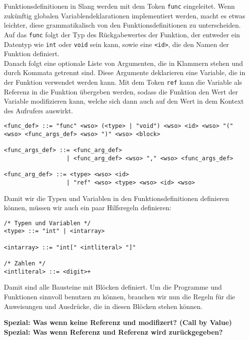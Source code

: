 Funktionsdefinitionen in Slang werden mit dem Token \texttt{func} eingeleitet.
Wenn zukünftig globalen Variablendeklarationen implementiert werden, macht es etwas leichter, diese grammatikalisch von den Funktionsdefinitionen zu unterscheiden.\\
Auf das \texttt{func} folgt der Typ des Rückgabewertes der Funktion, der entweder ein Datentyp wie \texttt{int} oder \texttt{void} sein kann, sowie eine \texttt{<id>}, die den Namen der Funktion definiert.\\
Danach folgt eine optionale Liste von Argumenten, die in Klammern stehen und durch Kommata getrennt sind.
Diese Argumente deklarieren eine Variable, die in der Funktion verwendet werden kann.
Mit dem Token \texttt{ref} kann die Variable als Referenz in die Funktion übergeben werden, sodass die Funktion den Wert der Variable modifizieren kann, welche sich dann auch auf den Wert in dem Kontext des Aufrufers auswirkt.

\begin{lstlisting}[caption={Grammatikdefinition Funktionsdefinitionen}]
<func_def> ::= "func" <wso> (<type> | "void") <wso> <id> <wso> "(" <wso> <func_args_def> <wso> ")" <wso> <block>

<func_args_def> ::= <func_arg_def>
                  | <func_arg_def> <wso> "," <wso> <func_args_def>

<func_arg_def> ::= <type> <wso> <id>
                  | "ref" <wso> <type> <wso> <id> <wso>
\end{lstlisting}

Damit wir die Typen und Variablen in den Funktionsdefinitionen definieren können, müssen wir auch ein paar Hilfsregeln definieren:

\begin{lstlisting}[caption={Grammatikdefinition Hilfsregeln}]
/* Typen und Variablen */
<type> ::= "int" | <intarray>

<intarray> ::= "int[" <intliteral> "]"

/* Zahlen */
<intliteral> ::= <digit>+
\end{lstlisting}

Damit sind alle Bausteine mit Blöcken definiert.
Um die Programme und Funktionen sinnvoll benutzen zu können, brauchen wir nun die Regeln für die Anweisungen und Ausdrücke, die in diesen Blöcken stehen können.

\textbf{Spezial: Was wenn keine Referenz und modifizert? (Call by Value)}\\
\textbf{Spezial: Was wenn Referenz und Referenz wird zurückgegeben?}\\
\\

